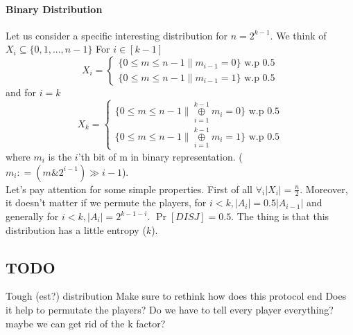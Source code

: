 \documentclass{article}
\begin{document}
\paragraph{Binary Distribution}
Let us consider a specific interesting distribution for $n = 2^{k-1}$. We think of $X_i \subseteq \{0, 1, ... , n-1\} $ \newline
For $i \in [k-1]$
  \[
    X_i=\left\{
                \begin{array}{ll}
                  \{0 \leq m \leq n-1 \| m_{i-1} = 0\} \text{ w.p 0.5} \\
                  \{0 \leq m \leq n-1 \| m_{i-1} = 1\} \text{ w.p 0.5}
                \end{array}
              \right.
  \]
and for $i = k$
  \[
    X_k=\left\{
                \begin{array}{ll}
                  \{0 \leq m \leq n-1 \| \underset{i=1}{\overset{k-1}{\oplus}} m_i = 0\} \text{ w.p 0.5} \\
                  \{0 \leq m \leq n-1 \| \underset{i=1}{\overset{k-1}{\oplus}} m_i = 1\} \text{ w.p 0.5}
                \end{array}
              \right.
  \]
where $m_i$ is the $i$'th bit of m in binary representation. ($m_i \mathrel{\mathop:}= ( m \mathop{\&} 2^{i-1} ) \gg i-1 $). \\
Let's pay attention for some simple properties. First of all $\forall_i |X_i| = \frac{n}{2}$. Moreover, it doesn't matter if we permute the players, for $i < k, |A_i| = 0.5|A_{i-1}|$ and generally for $i < k, |A_i| = 2^{k-1-i}$. $\Pr[DISJ] = 0.5$. The thing is that this distribution has a little entropy ($k$). 
\subsection{TODO}
Tough (est?) distribution\newline
Make sure to rethink how does this protocol end \newline
Does it help to permutate the players? \newline
Do we have to tell every player everything? maybe we can get rid of the k factor? \newline
\end{document}
